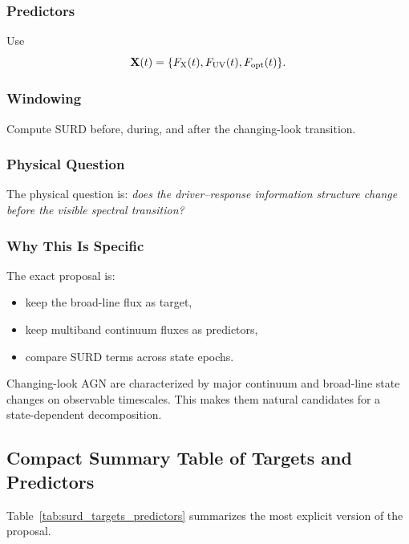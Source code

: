 \documentclass{article}
\begin{document}
\subsubsection{Predictors}

Use
\[
\mathbf{X}(t)=\{F_{\rm X}(t),F_{\rm UV}(t),F_{\rm opt}(t)\}.
\]

\subsubsection{Windowing}

Compute SURD before, during, and after the changing-look transition.

\subsubsection{Physical Question}

The physical question is: \emph{does the driver--response information structure change before the visible spectral transition?}

\subsubsection{Why This Is Specific}

The exact proposal is:
\begin{itemize}
    \item keep the broad-line flux as target,
    \item keep multiband continuum fluxes as predictors,
    \item compare SURD terms across state epochs.
\end{itemize}

Changing-look AGN are characterized by major continuum and broad-line state changes on observable timescales. This makes them natural candidates for a state-dependent decomposition.

\subsection{Compact Summary Table of Targets and Predictors}

Table~\ref{tab:surd_targets_predictors} summarizes the most explicit version of the proposal.
\end{document}
